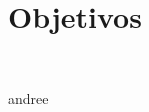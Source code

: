 \section{Objetivos} 
\textbf{}\\
\begin{flushleft}


\begin{itemize}


andree

	


\end{itemize} 


\end{flushleft}